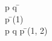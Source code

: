 \documentclass{article}
\begin{document}
\begin{proofbox}
\open
\: p \land q \= \asm \\
\: p \= \andelim(1) \\
\close
\: p \land q \rightarrow p \= \impliesintro(1, 2) \\
\end{proofbox}
\end{document}
